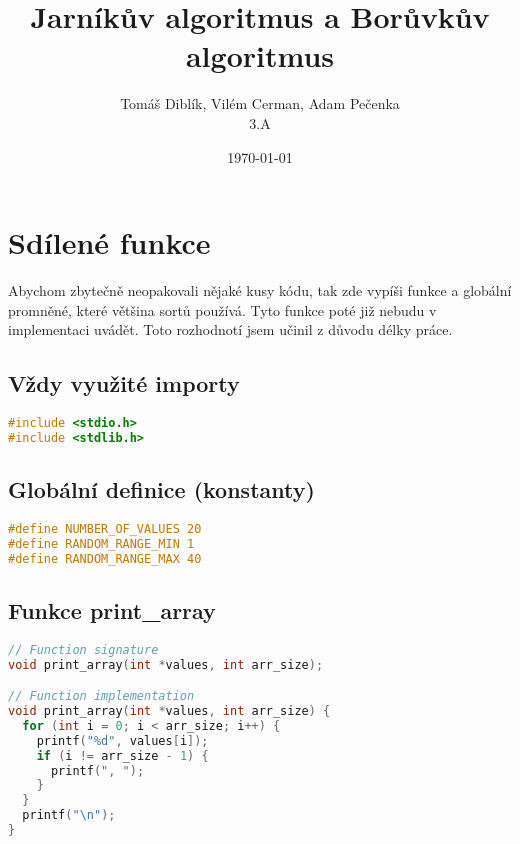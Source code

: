 \documentclass[11pt]{article}
\author{Tomáš Diblík, Vilém Cerman, Adam Pečenka \\ 3.A}
\title{Jarníkův algoritmus a Borůvkův algoritmus}
\date{\selectlanguage{czech}\today}
\begin{document}
\maketitle
\thispagestyle{empty}
\pagebreak


\tableofcontents
\thispagestyle{empty}
\pagebreak

\setcounter{page}{1}
\section{Sdílené funkce}
Abychom zbytečně neopakovali nějaké kusy kódu, tak
zde vypíši funkce a globální promněné, které většina sortů používá.
Tyto funkce poté již nebudu v implementaci uvádět.
Toto rozhodnotí jsem učinil z důvodu délky práce.

\subsection{Vždy využité importy}
\begin{lstlisting}[language=C]
#include <stdio.h>
#include <stdlib.h>
\end{lstlisting}

\subsection{Globální definice (konstanty)}
\begin{lstlisting}[language=C]
#define NUMBER_OF_VALUES 20
#define RANDOM_RANGE_MIN 1
#define RANDOM_RANGE_MAX 40
\end{lstlisting}

\subsection{Funkce print\_array}
\begin{lstlisting}[language=C]
// Function signature
void print_array(int *values, int arr_size);

// Function implementation
void print_array(int *values, int arr_size) {
  for (int i = 0; i < arr_size; i++) {
    printf("%d", values[i]);
    if (i != arr_size - 1) {
      printf(", ");
    }
  }
  printf("\n");
}
\end{lstlisting}
\end{document}
